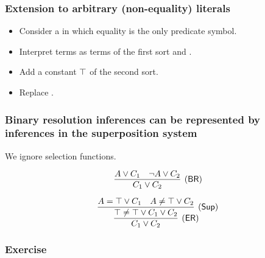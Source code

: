          \begin{frame}\frametitle{Extension to arbitrary (non-equality) literals}

\begin{itemize}
\item Consider a  in which equality is the only predicate
symbol.

\item Interpret terms as terms of the first sort and .

\item Add a \alert{constant $\top$ of the second sort}.

\item Replace .
\end{itemize}


                     \end{frame}


             \begin{frame}\frametitle{Binary resolution inferences can be
                 represented by inferences in the superposition system}

We ignore selection functions.

  \[\M{
      \infer[(\BRr)]{C_1 \orl C_2}{A \orl C_1 & \notl A \orl C_2}}
  \]

  \[\M{
      \infer[(\ruleER)]{
        C_1 \orl C_2
        }{
        \infer[(\ruleSup)]{
          \top \neql \top \orl C_1 \orl C_2
          }{
          A \eql \top \orl C_1 & A \neql \top \orl C_2
        }
      }
  }\]

                     \end{frame}


             \begin{frame}\frametitle{Exercise}


                     \end{frame}

